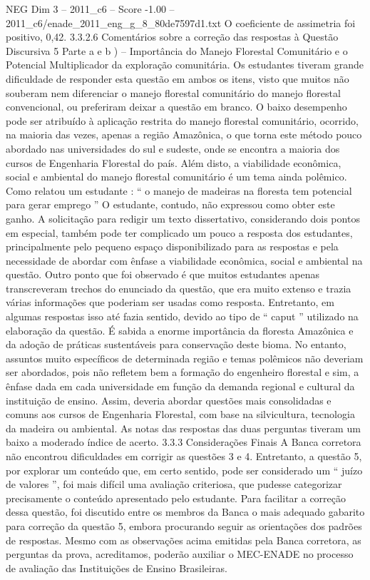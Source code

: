 \begin{textsample}{NEG Dim 3 – 2011\_c6 – Score -1.00 – 2011\_c6/enade\_2011\_eng\_g\_8\_80de7597d1.txt}
O coeficiente de assimetria foi positivo, 0,42. 3.3.2.6 Comentários sobre a correção das respostas à Questão Discursiva 5 Parte a e b ) – Importância do Manejo Florestal Comunitário e o Potencial Multiplicador da exploração comunitária.
Os estudantes tiveram grande dificuldade de responder esta questão em ambos os itens, visto que muitos não souberam nem diferenciar o manejo florestal comunitário do manejo florestal convencional, ou preferiram deixar a questão em branco.
O baixo desempenho pode ser atribuído à aplicação restrita do manejo florestal comunitário, ocorrido, na maioria das vezes, apenas a região Amazônica, o que torna este método pouco abordado nas universidades do sul e sudeste, onde se encontra a maioria dos cursos de Engenharia Florestal do país.
Além disto, a viabilidade econômica, social e ambiental do manejo florestal comunitário é um tema ainda polêmico.
Como relatou um estudante : “ o manejo de madeiras na floresta tem potencial para gerar emprego ” O estudante, contudo, não expressou como obter este ganho.
A solicitação para redigir um texto dissertativo, considerando dois pontos em especial, também pode ter complicado um pouco a resposta dos estudantes, principalmente pelo pequeno espaço disponibilizado para as respostas e pela necessidade de abordar com ênfase a viabilidade econômica, social e ambiental na questão.
Outro ponto que foi observado é que muitos estudantes apenas transcreveram trechos do enunciado da questão, que era muito extenso e trazia várias informações que poderiam ser usadas como resposta.
Entretanto, em algumas respostas isso até fazia sentido, devido ao tipo de “ caput ” utilizado na elaboração da questão.
É sabida a enorme importância da floresta Amazônica e da adoção de práticas sustentáveis para conservação deste bioma.
No entanto, assuntos muito específicos de determinada região e temas polêmicos não deveriam ser abordados, pois não refletem bem a formação do engenheiro florestal e sim, a ênfase dada em cada universidade em função da demanda regional e cultural da instituição de ensino.
Assim, deveria abordar questões mais consolidadas e comuns aos cursos de Engenharia Florestal, com base na silvicultura, tecnologia da madeira ou ambiental.
As notas das respostas das duas perguntas tiveram um baixo a moderado índice de acerto. 3.3.3 Considerações Finais A Banca corretora não encontrou dificuldades em corrigir as questões 3 e 4.
Entretanto, a questão 5, por explorar um conteúdo que, em certo sentido, pode ser considerado um “ juízo de valores ”, foi mais difícil uma avaliação criteriosa, que pudesse categorizar precisamente o conteúdo apresentado pelo estudante.
Para facilitar a correção dessa questão, foi discutido entre os membros da Banca o mais adequado gabarito para correção da questão 5, embora procurando seguir as orientações dos padrões de respostas.
Mesmo com as observações acima emitidas pela Banca corretora, as perguntas da prova, acreditamos, poderão auxiliar o MEC-ENADE no processo de avaliação das Instituições de Ensino Brasileiras.

\end{textsample}
